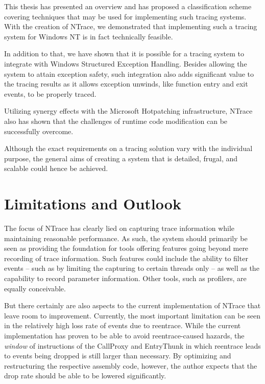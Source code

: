 This thesis has presented an overview and has proposed a classification scheme covering
techniques that may be used for implementing such tracing systems. With the creation
of NTrace, we demonstrated that implementing such a tracing system for Windows NT
is in fact technically feasible.

In addition to that, we have shown that it is possible for a tracing system to integrate
with Windows Structured Exception Handling. Besides allowing the system to attain exception
safety, such integration also adds significant value to the tracing results as it allows exception unwinds, 
like function entry and exit events, to be properly traced.

Utilizing synergy effects with the Microsoft Hotpatching infrastructure, NTrace also
has shown that the challenges of runtime code modification can be successfully overcome. 

Although the exact requirements on a tracing solution vary with the individual purpose, 
the general aims of creating a system that is detailed, frugal, and scalable could hence be achieved.

\section*{Limitations and Outlook}
The focus of NTrace has clearly lied on capturing trace information while maintaining 
reasonable performance. As such, the system should primarily be seen as providing the foundation 
for tools offering features going beyond mere recording of trace information.
Such features could include the ability to filter events -- such as by limiting the 
capturing to certain threads only -- as well as the capability to record parameter
information. Other tools, such as profilers, are equally conceivable.


But there certainly are also aspects to the current implementation of NTrace that leave room to improvement.
Currently, the most important limitation can be seen in the relatively high loss rate of events
due to reentrace. While the current implementation has proven to be able to avoid reentrace-caused
hazards, the \emph{window} of instructions of the CallProxy and EntryThunk in which reentrace 
leads to events being dropped is still larger than necessary. By optimizing and restructuring the respective
assembly code, however, the author expects that the drop rate should be able to be 
lowered significantly.

